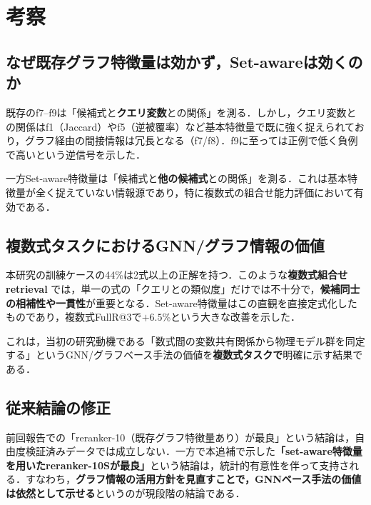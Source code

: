 \documentclass[11pt,a4paper]{ltjsarticle}
\begin{document}
\section{考察}

\subsection{なぜ既存グラフ特徴量は効かず，Set-awareは効くのか}

既存のf7--f9は「候補式と\textbf{クエリ変数}との関係」を測る．しかし，クエリ変数との関係はf1（Jaccard）やf5（逆被覆率）など基本特徴量で既に強く捉えられており，グラフ経由の間接情報は冗長となる（f7/f8）．f9に至っては正例で低く負例で高いという逆信号を示した．

一方Set-aware特徴量は「候補式と\textbf{他の候補式}との関係」を測る．これは基本特徴量が全く捉えていない情報源であり，特に複数式の組合せ能力評価において有効である．

\subsection{複数式タスクにおけるGNN/グラフ情報の価値}

本研究の訓練ケースの44\%は2式以上の正解を持つ．このような\textbf{複数式組合せ retrieval} では，単一の式の「クエリとの類似度」だけでは不十分で，\textbf{候補同士の相補性や一貫性}が重要となる．Set-aware特徴量はこの直観を直接定式化したものであり，複数式FullR@3で$+6.5$\%という大きな改善を示した．

これは，当初の研究動機である「数式間の変数共有関係から物理モデル群を同定する」というGNN/グラフベース手法の価値を\textbf{複数式タスクで}明確に示す結果である．

\subsection{従来結論の修正}

前回報告での「reranker-10（既存グラフ特徴量あり）が最良」という結論は，自由度検証済みデータでは成立しない．一方で本追補で示した\textbf{「set-aware特徴量を用いたreranker-10Sが最良」}という結論は，統計的有意性を伴って支持される．すなわち，\textbf{グラフ情報の活用方針を見直すことで，GNNベース手法の価値は依然として示せる}というのが現段階の結論である．

\end{document}
